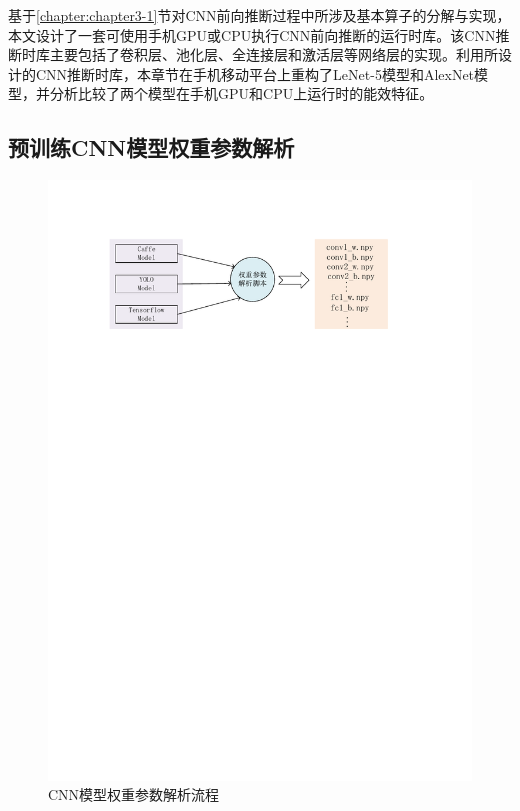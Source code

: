 基于\ref{chapter:chapter3-1}节对CNN前向推断过程中所涉及基本算子的分解与实现，本文设计了一套可使用手机GPU或CPU执行CNN前向推断的运行时库。该CNN推断时库主要包括了卷积层、池化层、全连接层和激活层等网络层的实现。利用所设计的CNN推断时库，本章节在手机移动平台上重构了LeNet-5模型和AlexNet模型，并分析比较了两个模型在手机GPU和CPU上运行时的能效特征。

\subsection{预训练CNN模型权重参数解析}
\label{chapter:chapter321}

\begin{figure}[htbp]
    \begin{center}
    \includegraphics{figures/weight.pdf}
    \end{center}
    \caption{CNN模型权重参数解析流程}\label{figure:figure14}
\end{figure}

